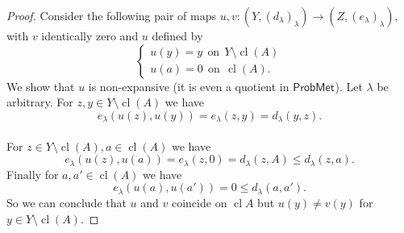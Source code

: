 \documentclass[10pt,a4paper]{amsart}
\newcommand{\PM}{\ensuremath{\mathsf{ProbMet_{}}}}
\DeclareMathOperator{\cl}{cl}
\renewcommand{\l}{\ensuremath{\lambda}}
\def\rw{\rightarrow}
\begin{document}
\begin{proof}
Consider the following pair of maps $u,v: (Y, (d_\l)_\l) \rw (Z, (e_\l)_\l),$ with $v$ identically zero and $u$ defined by
$$
  \begin{cases}  u(y) = y \ \  \text{on} \ \ Y \setminus \cl(A) \\
 u(a) = 0  \  \ \text{on} \  \  \cl(A).  \end{cases}
$$
We show that $u$ is non-expansive (it is even a quotient in $\PM$). Let $\l $ be arbitrary. For $z,y \in Y \setminus \cl(A)$ we have $$e_\l(u(z), u(y)) = e_\l(z,y) = d_\l(y,z).$$\\
For $z \in Y \setminus \cl(A), a \in \cl(A)$ we have $$e_\l(u(z), u(a)) = e_\l(z,0) = d_\l(z, A) \leq d_\l(z,a).$$
Finally for $a  , a'  \in \cl(A)$ we have $$e_\l(u(a), u(a')) = 0 \leq d_\l(a,a').$$ 
So we can conclude that $u$ and $v$ coincide on $\cl{A}$ but  $u(y) \not = v(y)$ for $y \in Y \setminus \cl(A).$ 

\end{proof}
\end{document}
